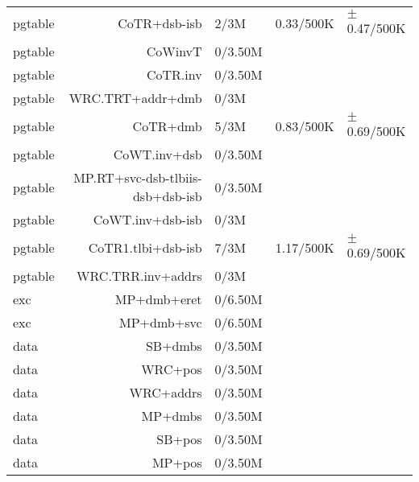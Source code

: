 \begin{tabular}{l r l l l}
   pgtable & CoTR+dsb-isb & 2/3M & 0.33/500K & $\pm$ 0.47/500K \\
   pgtable & CoWinvT & 0/3.50M & & \\
   pgtable & CoTR.inv & 0/3.50M & & \\
   pgtable & WRC.TRT+addr+dmb & 0/3M & & \\
   pgtable & CoTR+dmb & 5/3M & 0.83/500K & $\pm$ 0.69/500K \\
   pgtable & CoWT.inv+dsb & 0/3.50M & & \\
   pgtable & MP.RT+svc-dsb-tlbiis-dsb+dsb-isb & 0/3.50M & & \\
   pgtable & CoWT.inv+dsb-isb & 0/3M & & \\
   pgtable & CoTR1.tlbi+dsb-isb & 7/3M & 1.17/500K & $\pm$ 0.69/500K \\
   pgtable & WRC.TRR.inv+addrs & 0/3M & & \\
   exc & MP+dmb+eret & 0/6.50M & & \\
   exc & MP+dmb+svc & 0/6.50M & & \\
   data & SB+dmbs & 0/3.50M & & \\
   data & WRC+pos & 0/3.50M & & \\
   data & WRC+addrs & 0/3.50M & & \\
   data & MP+dmbs & 0/3.50M & & \\
   data & SB+pos & 0/3.50M & & \\
   data & MP+pos & 0/3.50M & & \\
\hline
\end{tabular}
